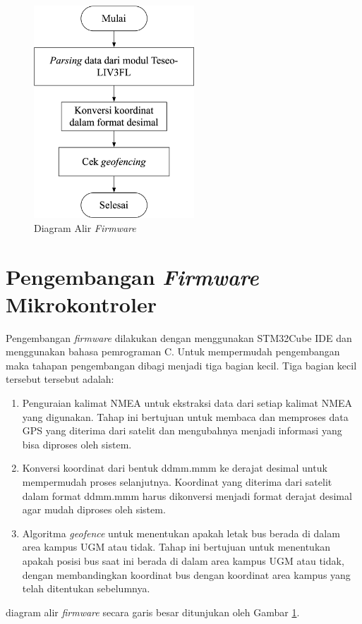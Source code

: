 \begin{figure}[H]
	\centering
	\includegraphics[width=6cm]{contents/chapter-3/firmware-diagram.png}
	\caption{Diagram Alir \textit{Firmware}}
	\label{Fig: flowchart-firmware}
\end{figure}

\section{Pengembangan \textit{Firmware} Mikrokontroler}
Pengembangan \textit{firmware} dilakukan dengan menggunakan STM32Cube IDE dan menggunakan bahasa pemrograman C. Untuk mempermudah pengembangan maka tahapan pengembangan dibagi menjadi tiga bagian kecil. Tiga bagian kecil tersebut tersebut adalah:
\begin{enumerate}
	\item Penguraian kalimat NMEA untuk ekstraksi data dari setiap kalimat NMEA yang digunakan. Tahap ini bertujuan untuk membaca dan memproses data GPS yang diterima dari satelit dan mengubahnya menjadi informasi yang bisa diproses oleh sistem.
	\item Konversi koordinat dari bentuk ddmm.mmm ke derajat desimal untuk mempermudah proses selanjutnya. Koordinat yang diterima dari satelit dalam format ddmm.mmm harus dikonversi menjadi format derajat desimal agar mudah diproses oleh sistem.
	\item Algoritma \textit{geofence} untuk menentukan apakah letak bus berada di dalam area kampus UGM atau tidak. Tahap ini bertujuan untuk menentukan apakah posisi bus saat ini berada di dalam area kampus UGM atau tidak, dengan membandingkan koordinat bus dengan koordinat area kampus yang telah ditentukan sebelumnya.
\end{enumerate}
diagram alir \textit{firmware} secara garis besar ditunjukan oleh Gambar \ref{Fig: flowchart-firmware}.

